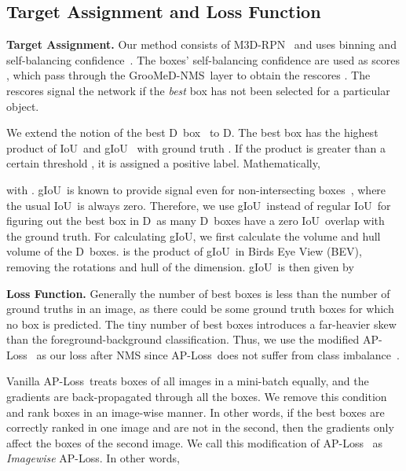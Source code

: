 \documentclass[final]{cvpr}
\newcommand{\methodName}{GrooMeD-NMS}
\newcommand{\iou}{IoU}
\newcommand{\twoD}{D}
\newcommand{\threeD}{D}
\newcommand{\iouTwoD}{\iou}
\newcommand{\iouThreeD}{\iou}
\newcommand{\giouTwoD}{g\iouTwoD}
\newcommand{\giouThreeD}{g\iouThreeD}
\newcommand{\ap}{AP}
\newcommand{\aploss}{\ap-Loss}
\newcommand{\imageWise}{Imagewise}
\begin{document}
\subsection{Target Assignment and Loss Function}\label{sec:target_loss}
    
\noindent\textbf{Target Assignment.}
            Our method consists of M3D-RPN~\cite{brazil2019m3d} and uses binning and self-balancing confidence~\cite{brazil2020kinematic}. The boxes' self-balancing confidence are used as scores , which pass through the \methodName~layer to obtain the rescores . The rescores signal the network if the \emph{best} box has not been selected for a particular object. 
            
            We extend the notion of the best \twoD~box~\cite{prokudin2017learning} to \threeD. The best box has the highest product of \iouTwoD~and \giouThreeD~\cite{rezatofighi2019generalized} with ground truth . If the product is greater than a certain threshold , it is assigned a positive label. Mathematically,
            
            with . 
            \giouThreeD~is known to provide signal even for non-intersecting boxes~\cite{rezatofighi2019generalized}, where the usual \iouThreeD~is always zero. 
            Therefore, we use \giouThreeD~instead of regular \iouThreeD~for figuring out the best box in \threeD~as many \threeD~boxes have a zero \iouThreeD~overlap with the ground truth.
            For calculating \giouThreeD, we first calculate the volume  and hull volume  of the \threeD~boxes.   is the product of \giouTwoD~in Birds Eye View (BEV), removing the rotations and hull of the  dimension. \giouThreeD~is then given by
             
            
\noindent\textbf{Loss Function.}
            Generally the number of best boxes is less than the number of ground truths in an image, as there could be some ground truth boxes for which no box is predicted. The tiny number of best boxes introduces a far-heavier skew than the foreground-background classification. Thus, we use the modified \aploss~\cite{chen2020ap} as our loss after NMS since \aploss~does not suffer from class imbalance~\cite{chen2020ap}. 
            
            Vanilla \aploss~treats boxes of all images in a mini-batch equally, and the gradients are back-propagated through all the boxes. We remove this condition and rank boxes in an image-wise manner. In other words, if the best boxes are correctly ranked in one image and are not in the second, then the gradients only affect the boxes of the second image. We call this modification of \aploss~
            as \emph{\imageWise} \aploss. In other words,
            \vspace{-0.15cm}
            
\end{document}
